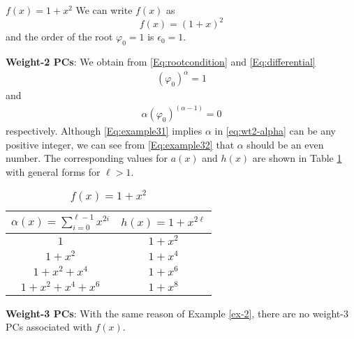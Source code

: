 \begin{example}
	$f(x)=1+x^2$\newline
	We can write $f(x)$ as
	\[
	f(x)=(1+x)^2\]
	and the order of the root $\varphi_0=1$ is $\epsilon_0=1$.
	
	\textbf{Weight-2 PCs}: We obtain from \eqref{Eq:rootcondition} and \eqref{Eq:differential}
	\begin{align}
		(\varphi_0)^{\alpha} = 1
		\label{Eq:example31}
	\end{align}
	and
	\begin{align}
		\alpha(\varphi_0)^{(\alpha-1)} = 0
		\label{Eq:example32}
	\end{align}	
	respectively. Although \eqref{Eq:example31} implies $\alpha$ in \eqref{eq:wt2-alpha} can be any positive integer, we can see from \eqref{Eq:example32} that $\alpha$  should be an even number.
	The corresponding values for $a(x)$ and $h(x)$ are shown in Table \ref{novelTab1} with general forms for $\ell>1$.
	\begin{table}[htbp]
		\renewcommand{\arraystretch}{1.3}
		\caption{$f(x)=1+x^2$}
		\centering
		\begin{tabular}{c c } 
			\hline
			$\alpha(x)=\sum_{i=0}^{\ell-1} x^{2i}$ & $h(x)=1+x^{2\ell}$ \\ [0.5ex] 
			\hline\hline
			$1$ & $1+x^2$\\ 
			$1+x^2$ & $1+x^4$ \\
			$1+x^2+x^4$ & $1+x^6$\\
			$1+x^2+x^4+x^6$ & $1+x^8$ 
		\end{tabular}
		\label{novelTab1}
	\end{table}
	
	\textbf{Weight-3 PCs}:
	With the same reason of Example \ref{ex-2}, there are no weight-3 PCs associated with $f(x)$.
\label{ex-3}
\end{example}


